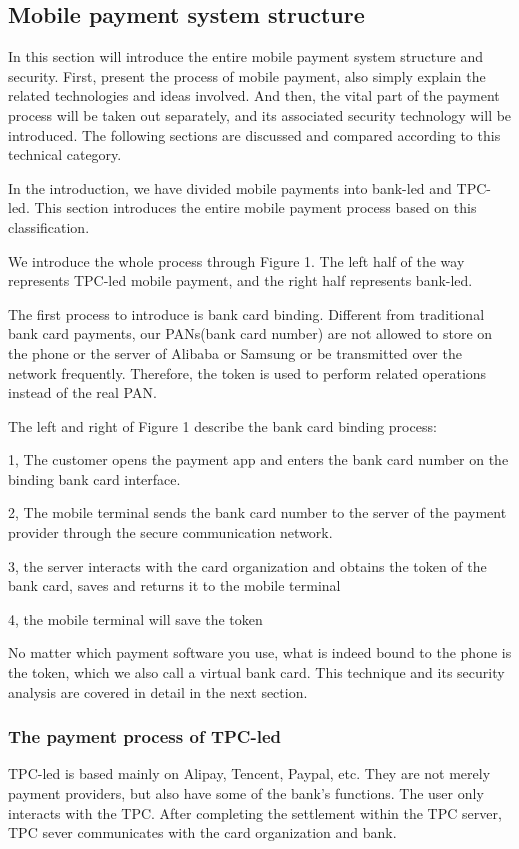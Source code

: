 \documentclass[journal]{IEEEtran}
\begin{document}
\subsection{Mobile payment system structure}
In this section will introduce the entire mobile payment system structure and security. First, present the process of mobile payment, also simply explain the related technologies and ideas involved. And then, the vital part of the payment process will be taken out separately, and its associated security technology will be introduced. The following sections are discussed and compared according to this technical category.

In the introduction, we have divided mobile payments into bank-led and TPC-led. This section introduces the entire mobile payment process based on this classification.

   
We introduce the whole process through Figure 1. The left half of the way represents TPC-led mobile payment, and the right half represents bank-led.

The first process to introduce is bank card binding. Different from traditional bank card payments, our PANs(bank card number) are not allowed to store on the phone or the server of  Alibaba or Samsung or be transmitted over the network frequently. Therefore, the token is used to perform related operations instead of the real PAN.

The left and right of Figure 1 describe the bank card binding process:

1, The customer opens the payment app and enters the bank card number on the binding bank card interface.

2, The mobile terminal sends the bank card number to the server of the payment provider through the secure communication network.

3, the server interacts with the card organization and obtains the token of the bank card, saves and returns it to the mobile terminal

4, the mobile terminal will save the token


No matter which payment software you use, what is indeed bound to the phone is the token, which we also call a virtual bank card. This technique and its security analysis are covered in detail in the next section.

\subsubsection{The payment process of TPC-led}
TPC-led is based mainly on Alipay, Tencent, Paypal, etc. They are not merely payment providers, but also have some of the bank's functions. The user only interacts with the TPC. After completing the settlement within the TPC server, TPC sever communicates with the card organization and bank. 
\end{document}
